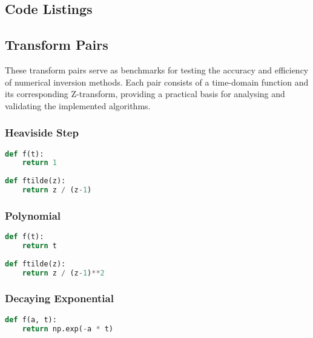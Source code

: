 \begin{appendices}

%

\chapter{Code Listings}\label{chapter:code_listings}

\section{Transform Pairs}
These transform pairs serve as benchmarks for testing the accuracy and efficiency of numerical inversion methods. Each pair consists of a time-domain function and its corresponding Z-transform, providing a practical basis for analysing and validating the implemented algorithms.

\subsection{Heaviside Step}
\begin{lstlisting}[language=Python, caption= Implementation of the Heaviside Step function and its $\mathcal{Z}$-transform (Section \ref{section:heaviside_step})]
def f(t):
    return 1
    
def ftilde(z):
    return z / (z-1)
\end{lstlisting}

\subsection{Polynomial}
\begin{lstlisting}[language=Python, caption= Implementation of the Polynomial function and its $\mathcal{Z}$-transform (Section \ref{section:polynomial})]
def f(t):
    return t
    
def ftilde(z):
    return z / (z-1)**2
\end{lstlisting}

\subsection{Decaying Exponential}
\begin{lstlisting}[language=Python, caption= Implementation of the Decaying Exp function and its $\mathcal{Z}$-transform (Section \ref{section:decaying_exp})]
def f(a, t):
    return np.exp(-a * t)
    

\end{lstlisting}
\end{appendices}
